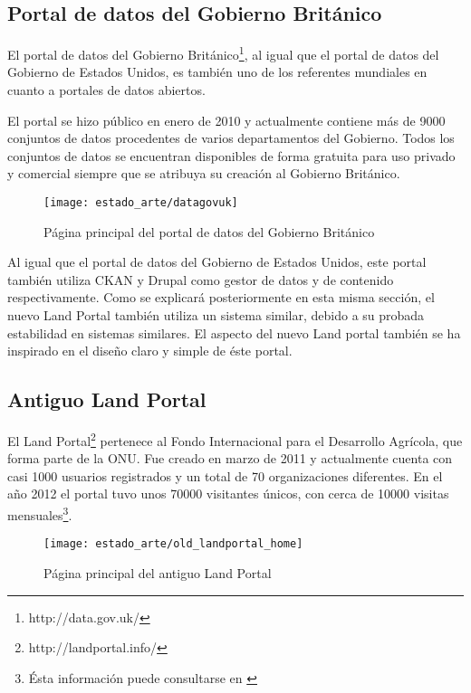 {\subsection{Portal de datos del Gobierno Británico}
El portal de datos del Gobierno Británico\footnote{http://data.gov.uk/}, al igual que el portal de datos del Gobierno de Estados Unidos, es también uno de los referentes mundiales en cuanto a portales de datos abiertos.

El portal se hizo público en enero de 2010 y actualmente contiene más de 9000 conjuntos de datos procedentes de varios departamentos del Gobierno.  Todos los conjuntos de datos se encuentran disponibles de forma gratuita para uso privado y comercial siempre que se atribuya su creación al Gobierno Británico.
\begin{figure}[h]
\centering
\texttt{[image: estado\_arte/datagovuk]}
\caption{Página principal del portal de datos del Gobierno Británico}
\end{figure}

Al igual que el portal de datos del Gobierno de Estados Unidos, este portal también utiliza CKAN y Drupal como gestor de datos y de contenido respectivamente.  Como se explicará posteriormente en esta misma sección, el nuevo Land Portal también utiliza un sistema similar, debido a su probada estabilidad en sistemas similares.  El aspecto del nuevo Land portal también se ha inspirado en el diseño claro y simple de éste portal.

\subsection{Antiguo Land Portal}
El Land Portal\footnote{http://landportal.info/} pertenece al Fondo Internacional para
el Desarrollo Agrícola, que forma parte de la ONU.  Fue creado en marzo de 2011 y actualmente cuenta con casi 1000 usuarios registrados y un total de 70 organizaciones diferentes. En el año 2012 el portal tuvo unos 70000 visitantes únicos, con cerca de 10000 visitas mensuales\footnote{Ésta información puede consultarse en \cite[página 3]{landportal-strategy}}.
\begin{figure}[h]
\centering
\texttt{[image: estado\_arte/old\_landportal\_home]}
\caption{Página principal del antiguo Land Portal}
\end{figure}

}
